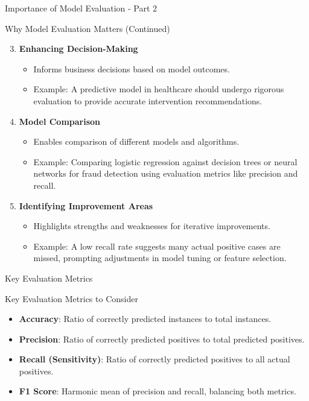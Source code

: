 \documentclass[aspectratio=169]{beamer}
\begin{document}
\begin{frame}[fragile]{Importance of Model Evaluation - Part 2}
    \begin{block}{Why Model Evaluation Matters (Continued)}
        \begin{enumerate}
            \setcounter{enumi}{2}
            \item \textbf{Enhancing Decision-Making}
            \begin{itemize}
                \item Informs business decisions based on model outcomes.
                \item Example: A predictive model in healthcare should undergo rigorous evaluation to provide accurate intervention recommendations.
            \end{itemize}

            \item \textbf{Model Comparison}
            \begin{itemize}
                \item Enables comparison of different models and algorithms.
                \item Example: Comparing logistic regression against decision trees or neural networks for fraud detection using evaluation metrics like precision and recall.
            \end{itemize}

            \item \textbf{Identifying Improvement Areas}
            \begin{itemize}
                \item Highlights strengths and weaknesses for iterative improvements.
                \item Example: A low recall rate suggests many actual positive cases are missed, prompting adjustments in model tuning or feature selection.
            \end{itemize}
        \end{enumerate}
    \end{block}
\end{frame}

\begin{frame}[fragile]{Key Evaluation Metrics}
    \begin{block}{Key Evaluation Metrics to Consider}
        \begin{itemize}
            \item \textbf{Accuracy}: Ratio of correctly predicted instances to total instances.
            \item \textbf{Precision}: Ratio of correctly predicted positives to total predicted positives.
            \item \textbf{Recall (Sensitivity)}: Ratio of correctly predicted positives to all actual positives.
            \item \textbf{F1 Score}: Harmonic mean of precision and recall, balancing both metrics.
        \end{itemize}
    \end{block}
\end{frame}
\end{document}
